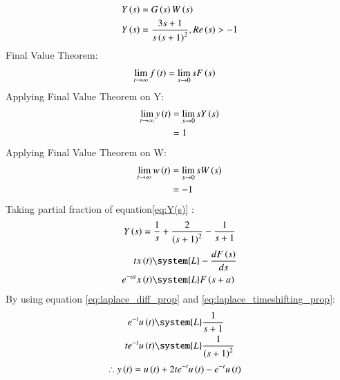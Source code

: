 \documentclass[journal,12pt,twocolumn]{IEEEtran}
\theoremstyle{remark}
\begin{document}
\begin{align}
    Y\left(s\right) &= G\left(s\right)W\left(s\right)\\
    Y\left(s\right) &=  \frac{3s+1}{s\left(s+1\right)^2} ,  Re\left(s\right)>-1 \label{eq:Y(s)}
\end{align}
Final Value Theorem:    
\begin{align}
    \lim_{t \to \infty} f\left(t\right)&= \lim_{s \to 0} sF\left(s\right)\label{eq:gate_ee_Q14.3}
\end{align}
Applying Final Value Theorem on Y:
\begin{align}
     \lim_{t \to \infty} y\left(t\right)&= \lim_{s \to 0} sY\left(s\right)\\
                            &= 1
\end{align}
Applying Final Value Theorem on W:
\begin{align}
     \lim_{t \to \infty} w\left(t\right)&= \lim_{s \to 0} sW\left(s\right)\\
                            &= -1
\end{align}
Taking partial fraction of equation\eqref{eq:Y(s)} :
\begin{align}
    Y\left(s\right) &= \frac{1}{s} + \frac{2}{\left(s+1\right)^2} - \frac{1}{s+1}\\
\end{align}
\begin{align}
    tx\brak{t} &\system{L} -\frac{d{F\brak{s}}}{ds} \label{eq:laplace_diff_prop}\\
    e^{-at}x\brak{t} &\system{L} F\brak{s+a}\label{eq:laplace_timeshifting_prop}
\end{align}
By using equation \eqref{eq:laplace_diff_prop} and \eqref{eq:laplace_timeshifting_prop}:
\begin{align}
    e^{-t}u\brak{t} &\system{L} \frac{1}{s+1}\\
    t e^{-t}u\brak{t} &\system{L} \frac{1}{\brak{s+1}^2}
\end{align}
\begin{align}
    \therefore y\left(t\right) &= u\left(t\right)+ 2t e^{-t}u\left(t\right) - e^{-t}u\left(t\right)
\end{align}
\end{document}
